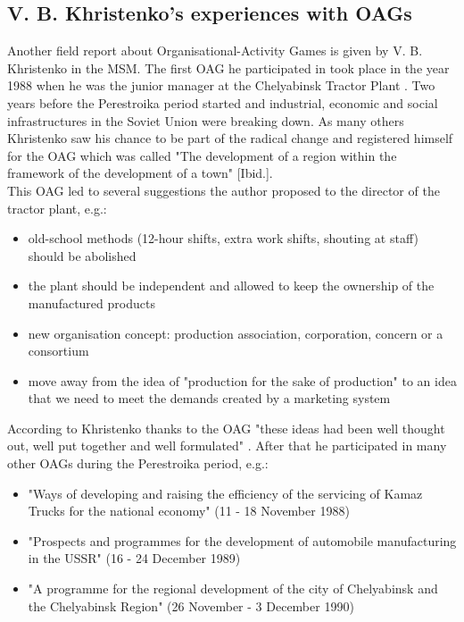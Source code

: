 \documentclass[11pt,a4paper]{article}
\begin{document}
\subsection{V. B. Khristenko's experiences with OAGs}
Another field report about Organisational-Activity Games is given by V. B. Khristenko in the MSM. The first OAG he participated in took place in the year 1988 when he was the junior manager at the Chelyabinsk Tractor Plant  \cite[p. 437ff.]{MSM}. Two years before the Perestroika period started and industrial, economic and social infrastructures in the Soviet Union were breaking down. As many others Khristenko saw his chance to be part of the radical change and registered himself for the OAG which was called "The development of a region within the framework of the development of a town" [Ibid.].\\
This OAG led to several suggestions the author proposed to the director of the tractor plant, e.g.:
\begin{itemize}
	\setlength\itemsep{0em}
	\item old-school methods (12-hour shifts, extra work shifts, shouting at staff) should be abolished
	\item the plant should be independent and allowed to keep the ownership of the manufactured products
	\item new organisation concept: production association, corporation, concern or a consortium
	\item move away from the idea of "production for the sake of production" to an idea that we need to meet the demands created by a marketing system
\end{itemize}
According to Khristenko thanks to the OAG "these ideas had been well thought out, well put together and well formulated" \cite[p. 441]{MSM}. After that he participated in many other OAGs during the Perestroika period, e.g.:
\begin{itemize}
	\setlength\itemsep{0em}
	\item "Ways of developing and raising the efficiency of the servicing of Kamaz Trucks for the national economy" (11 - 18 November 1988)
	\item "Prospects and programmes for the development of automobile manufacturing in the USSR" (16 - 24 December 1989)
	\item "A programme for the regional development of the city of Chelyabinsk and the Chelyabinsk Region" (26 November - 3 December 1990)
\end{itemize}
\end{document}
